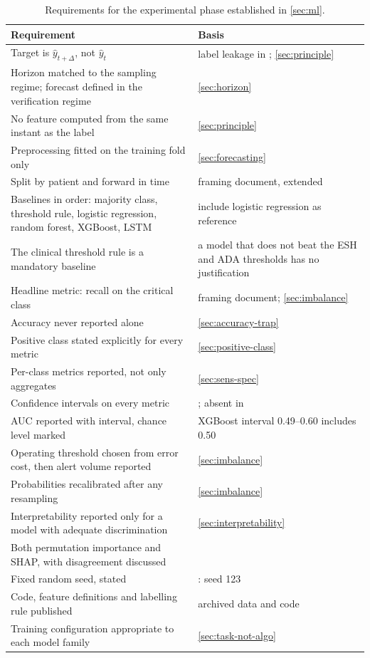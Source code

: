 \documentclass[12pt,a4paper,oneside]{report}
\begin{document}
\begin{table}[htbp]
\centering\footnotesize
\caption{Requirements for the experimental phase established in \cref{sec:ml}.}\label{tab:spec23}
\begin{tabularx}{\textwidth}{@{}X >{\raggedright\arraybackslash}p{5.9cm}@{}}
\toprule
\textbf{Requirement} & \textbf{Basis} \\
\midrule
Target is $\hat{y}_{t+\Delta}$, not $\hat{y}_t$ & label leakage in \textcite{efendi2025}; \cref{sec:principle} \\
Horizon matched to the sampling regime; forecast defined in the verification regime & \cref{sec:horizon} \\
No feature computed from the same instant as the label & \cref{sec:principle} \\
Preprocessing fitted on the training fold only & \cref{sec:forecasting} \\
Split by patient and forward in time & framing document, extended \\
Baselines in order: majority class, threshold rule, logistic regression, random forest, XGBoost, LSTM & \textcite{mendoza2025} include logistic regression as reference \\
The clinical threshold rule is a mandatory baseline & a model that does not beat the ESH and ADA thresholds has no justification \\
Headline metric: recall on the critical class & framing document; \cref{sec:imbalance} \\
Accuracy never reported alone & \cref{sec:accuracy-trap} \\
Positive class stated explicitly for every metric & \cref{sec:positive-class} \\
Per-class metrics reported, not only aggregates & \cref{sec:sens-spec} \\
Confidence intervals on every metric & \textcite{mendoza2025}; absent in \textcite{efendi2025} \\
AUC reported with interval, chance level marked & XGBoost interval 0.49--0.60 includes 0.50 \\
Operating threshold chosen from error cost, then alert volume reported & \cref{sec:imbalance} \\
Probabilities recalibrated after any resampling & \cref{sec:imbalance} \\
Interpretability reported only for a model with adequate discrimination & \cref{sec:interpretability} \\
Both permutation importance and SHAP, with disagreement discussed & \textcite{mendoza2025} \\
Fixed random seed, stated & \textcite{mendoza2025}: seed 123 \\
Code, feature definitions and labelling rule published & \textcite{mendoza2025} archived data and code \\
Training configuration appropriate to each model family & \cref{sec:task-not-algo} \\
\bottomrule
\end{tabularx}
\end{table}
\end{document}
